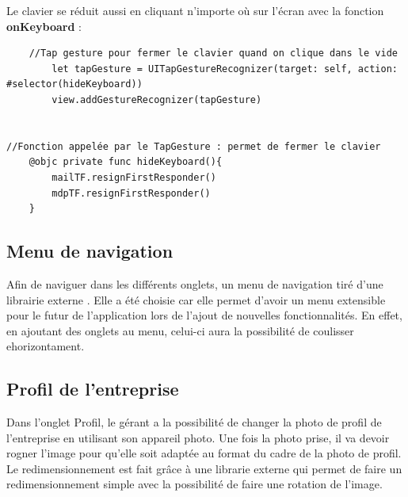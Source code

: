 \documentclass{article}
\begin{document}
Le clavier se réduit aussi en cliquant n'importe où sur l'écran avec la fonction \textbf{onKeyboard} :
\begin{verbatim}
    //Tap gesture pour fermer le clavier quand on clique dans le vide
        let tapGesture = UITapGestureRecognizer(target: self, action: #selector(hideKeyboard))
        view.addGestureRecognizer(tapGesture)


//Fonction appelée par le TapGesture : permet de fermer le clavier
    @objc private func hideKeyboard(){
        mailTF.resignFirstResponder()
        mdpTF.resignFirstResponder()
    }
\end{verbatim}

\newpage

\subsection{Menu de navigation}

Afin de naviguer dans les différents onglets, un menu de navigation tiré d'une librairie externe \cite{HorizontalScrollMenu}. Elle a été choisie car elle permet d'avoir un menu extensible pour le futur de l'application lors de l'ajout de nouvelles fonctionnalités. En effet, en ajoutant des onglets au menu, celui-ci aura la possibilité de coulisser ehorizontament.

\subsection{Profil de l'entreprise}

Dans l'onglet Profil, le gérant a la possibilité de changer la photo de profil de l'entreprise en utilisant son appareil photo. Une fois la photo prise, il va devoir rogner l'image pour qu'elle soit adaptée au format du cadre de la photo de profil. Le redimensionnement est fait grâce à une librarie externe \cite{uCrop} qui permet de faire un redimensionnement simple avec la possibilité de faire une rotation de l'image.
\end{document}
